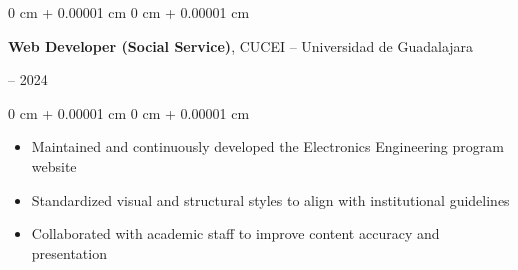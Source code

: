 \documentclass[10pt, letterpaper]{article}
\newenvironment{highlights}{
  \begin{itemize}[
        topsep=0.10 cm,
        parsep=0.10 cm,
        partopsep=0pt,
        itemsep=0pt,
        leftmargin=0 cm + 10pt
      ]
    }{
  \end{itemize}
} %
\newenvironment{onecolentry}{
  \begin{adjustwidth}{
      0 cm + 0.00001 cm
    }{
      0 cm + 0.00001 cm
    }
  }{
  \end{adjustwidth}
} %
\newenvironment{twocolentry}[2][]{
  \onecolentry
  \def\secondColumn{#2}
  \setcolumnwidth{\fill, 4.5 cm}
  \begin{paracol}{2}
  }{
    \switchcolumn \raggedleft \secondColumn
  \end{paracol}
  \endonecolentry
} %
\begin{document}
\begin{twocolentry}{ 2023 -- 2024 } \textbf{Web Developer (Social Service)}, CUCEI – Universidad de Guadalajara
\end{twocolentry} \vspace{0.10 cm}
\begin{onecolentry}
    \begin{highlights}
        \item Maintained and continuously developed the Electronics Engineering program website
        \item Standardized visual and structural styles to align with institutional guidelines
        \item Collaborated with academic staff to improve content accuracy and presentation
    \end{highlights}
\end{onecolentry} \vspace{0.2 cm}
\end{document}
